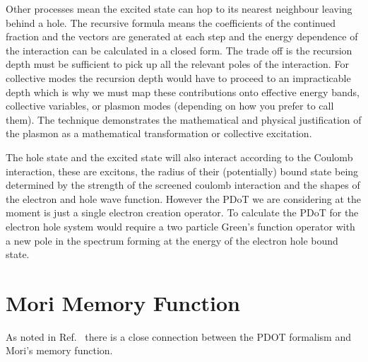 Other processes mean the excited state can hop 
to its nearest neighbour leaving behind a hole. The recursive formula means
the coefficients of the continued fraction and the vectors are generated at
each step and the energy dependence of the interaction can be calculated 
in a closed form. The trade off is the recursion depth must be sufficient to
pick up all the relevant poles of the interaction. For collective modes
the recursion depth would have to proceed to an impracticable depth which
is why we must map these contributions onto effective energy bands, collective
variables, or plasmon modes (depending on how you prefer to call them). 
The technique demonstrates the mathematical and physical justification 
of the plasmon as a mathematical transformation or collective excitation.

The hole state and the excited state will also interact according 
to the Coulomb interaction, these are excitons, the radius of their (potentially) 
bound state being determined by the strength of the screened coulomb interaction 
and the shapes of the electron and hole wave function. 
However the PDoT we are considering at the moment is just a single electron creation operator.
To calculate the PDoT for the electron hole system would require a 
two particle Green's function operator with a new pole in the spectrum forming
at the energy of the electron hole bound state.

\section{Mori Memory Function}
\label{sec:morimemory}
  As noted in Ref.~\cite{annett94} there is a close connection between the PDOT
formalism and Mori's memory function. 



